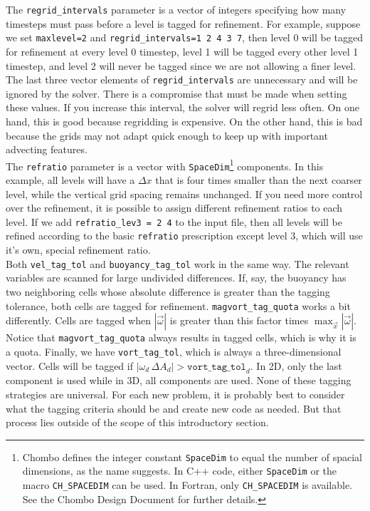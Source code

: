 \documentclass[12pt]{article}
\begin{document}
The \texttt{regrid\_intervals} parameter is a vector of integers specifying how many timesteps must pass before a level is tagged for refinement. For example, suppose we set \texttt{maxlevel=2} and \texttt{regrid\_intervals=1 2 4 3 7}, then level 0 will be tagged for refinement at every level 0 timestep, level 1 will be tagged every other level 1 timestep, and level 2 will never be tagged since we are not allowing a finer level. The last three vector elements of \texttt{regrid\_intervals} are unnecessary and will be ignored by the solver. There is a compromise that must be made when setting these values. If you increase this interval, the solver will regrid less often. On one hand, this is good because regridding is expensive. On the other hand, this is bad because the grids may not adapt quick enough to keep up with important advecting features. \\

The \texttt{refratio} parameter is a vector with \texttt{SpaceDim}\footnote{Chombo defines the integer constant \texttt{SpaceDim} to equal the number of spacial dimensions, as the name suggests. In C++ code, either \texttt{SpaceDim} or the macro \texttt{CH\_SPACEDIM} can be used. In Fortran, only \texttt{CH\_SPACEDIM} is available. See the Chombo Design Document for further details.} components. In this example, all levels will have a $\Delta x$ that is four times smaller than the next coarser level, while the vertical grid spacing remains unchanged. If you need more control over the refinement, it is possible to assign different refinement ratios to each level. If we add \texttt{refratio\_lev3 = 2 4} to the input file, then all levels will be refined according to the basic \texttt{refratio} prescription except level 3, which will use it's own, special
refinement ratio.\\

Both \texttt{vel\_tag\_tol} and \texttt{buoyancy\_tag\_tol} work in the same way. The relevant variables are scanned for large undivided differences. If, say, the buoyancy has two neighboring cells whose absolute difference is greater than the tagging tolerance, both cells are tagged for refinement. \texttt{magvort\_tag\_quota} works a bit differently. Cells are tagged when $|\vec{\omega}|$ is greater than this factor times $\max_{\vec{x}}|\vec{\omega}|$. Notice that \texttt{magvort\_tag\_quota} always results in tagged cells, which is why it is a quota. Finally, we have \texttt{vort\_tag\_tol}, which is always a three-dimensional vector. Cells will be tagged if $|\omega_d \, \Delta A_d| > \texttt{vort\_tag\_tol}_d$. In 2D, only the last component is used while in 3D, all components are used. None of these tagging strategies are universal. For each new problem, it is probably best to consider what the tagging criteria should be and create new code as needed. But that process lies outside of the scope of this introductory section.\\
\end{document}
